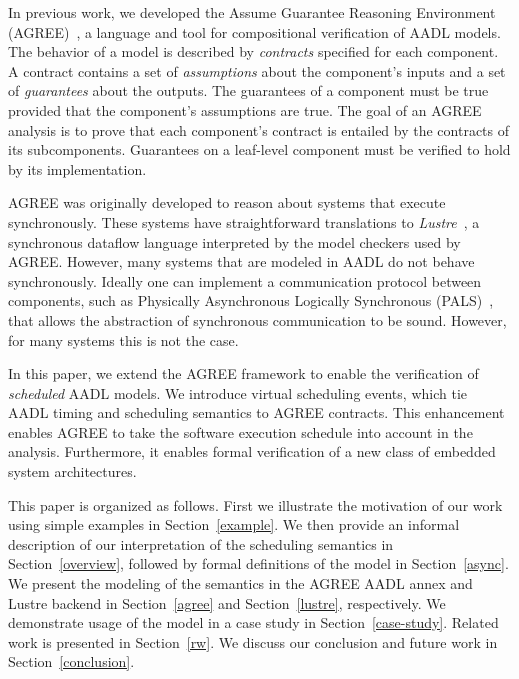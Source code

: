 In previous work, we developed the Assume Guarantee Reasoning Environment (AGREE)~\cite{8625938}, a language and tool for compositional verification of AADL models.  The behavior of a model is described by {\em contracts} specified for each component.  A contract contains a set of {\em assumptions} about the component's inputs and a set of {\em guarantees} about the outputs.  The guarantees of a component must be true provided that the component's assumptions are true.  The goal of an AGREE analysis is to prove that each component's contract is entailed by the contracts of its subcomponents.  Guarantees on a leaf-level component must be verified to hold by its implementation.  

AGREE was originally developed to reason about systems that execute synchronously. These systems have straightforward translations to \emph{Lustre}~\cite{lustre}, a synchronous dataflow language interpreted by the model checkers used by AGREE. However, many systems that are modeled in AADL do not behave synchronously. Ideally one can implement a communication protocol between components, such as Physically Asynchronous Logically Synchronous (PALS)~\cite{pals}, that allows the abstraction of synchronous communication to be sound. However, for many systems this is not the case.

In this paper, we extend the AGREE framework to enable the verification of \textit{scheduled} AADL models. We introduce virtual scheduling events, which tie AADL timing and scheduling semantics to AGREE contracts. This enhancement enables AGREE to take the software execution schedule into account in the analysis. Furthermore, it enables formal verification of a new class of embedded system architectures. 

This paper is organized as follows. First we illustrate the motivation of our work using simple examples in Section~\ref{example}. We then provide an informal description of our interpretation of the scheduling semantics in Section~\ref{overview}, followed by formal definitions of the model in Section~\ref{async}. We present the modeling of the semantics in the AGREE AADL annex and Lustre backend in Section~\ref{agree} and Section~\ref{lustre}, respectively. We demonstrate usage of the model in a case study in Section~\ref{case-study}. Related work is presented in Section~\ref{rw}.  We discuss our conclusion and future work in Section~\ref{conclusion}.  